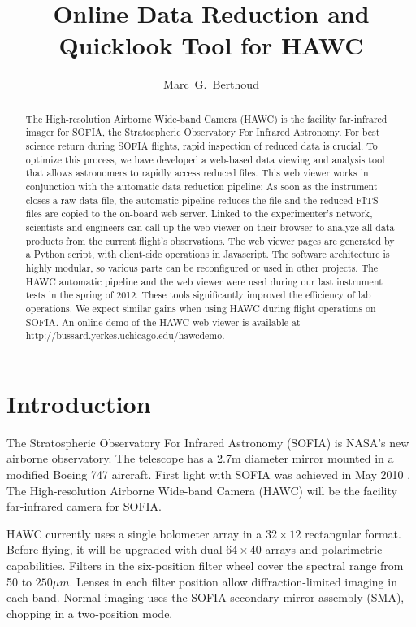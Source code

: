 
\resetcounters




\title{Online Data Reduction and Quicklook Tool for HAWC}
\author{Marc~G.~Berthoud
}


\begin{abstract}
The High-resolution Airborne Wide-band Camera (HAWC) is the facility
far-infrared imager for SOFIA, the Stratospheric Observatory For
Infrared Astronomy.  For best science return during SOFIA flights,
rapid inspection of reduced data is crucial. To optimize this process,
we have developed a web-based data viewing and analysis tool that
allows astronomers to rapidly access reduced files.  This web viewer
works in conjunction with the automatic data reduction pipeline: As
soon as the instrument closes a raw data file, the automatic pipeline
reduces the file and the reduced FITS files are copied to the on-board
web server. Linked to the experimenter's network, scientists and
engineers can call up the web viewer on their browser to analyze all
data products from the current flight's observations.  The web viewer
pages are generated by a Python script, with client-side operations in
Javascript. The software architecture is highly modular, so various
parts can be reconfigured or used in other projects.  The HAWC
automatic pipeline and the web viewer were used during our last
instrument tests in the spring of 2012. These tools significantly
improved the efficiency of lab operations. We expect similar gains
when using HAWC during flight operations on SOFIA. An online demo of
the HAWC web viewer is available at
http://bussard.yerkes.uchicago.edu/hawcdemo.\end{abstract}

\section{Introduction}

The Stratospheric Observatory For Infrared Astronomy (SOFIA) is NASA's
new airborne observatory. The telescope has a 2.7m diameter mirror
mounted in a modified Boeing 747 aircraft. First light with SOFIA was
achieved in May 2010 \citep{herter12}. The High-resolution Airborne
Wide-band Camera (HAWC) will be the facility far-infrared camera for
SOFIA.

HAWC currently uses a single bolometer array in a $32\times12$
rectangular format. Before flying, it will be upgraded with dual
$64\times40$ arrays and polarimetric capabilities. Filters in the
six-position filter wheel cover the spectral range from 50 to $250\mu
m$. Lenses in each filter position allow diffraction-limited imaging in
each band. Normal imaging uses the SOFIA secondary mirror assembly
(SMA), chopping in a two-position mode.

